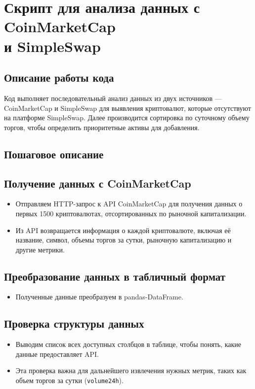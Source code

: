 \documentclass[12pt]{article}
\theoremstyle{indented}
\theoremstyle{definition}
\theoremstyle{remark}
\begin{document}
\newpage

\section{Скрипт для анализа данных с CoinMarketCap\\ и SimpleSwap}

\subsection*{Описание работы кода}
Код выполняет последовательный анализ данных из двух источников — CoinMarketCap и SimpleSwap для выявления криптовалют, которые отсутствуют на платформе SimpleSwap. Далее производится сортировка по суточному объему торгов, чтобы определить приоритетные активы для добавления.

\subsection*{Пошаговое описание}

\subsection{Получение данных с CoinMarketCap}
\begin{itemize}
    \item Отправляем HTTP-запрос к API CoinMarketCap для получения данных о первых 1500 криптовалютах, отсортированных по рыночной капитализации.
    \item Из API возвращается информация о каждой криптовалюте, включая её название, символ, объемы торгов за сутки, рыночную капитализацию и другие метрики.
\end{itemize}

\subsection{Преобразование данных в табличный формат}
\begin{itemize}
    \item Полученные данные преобразуем в pandas-DataFrame.
\end{itemize}

\subsection{Проверка структуры данных}
\begin{itemize}
    \item Выводим список всех доступных столбцов в таблице, чтобы понять, какие данные предоставляет API.
    \item Эта проверка важна для дальнейшего извлечения нужных метрик, таких как объем торгов за сутки (\texttt{volume24h}).
\end{itemize}
\end{document}
